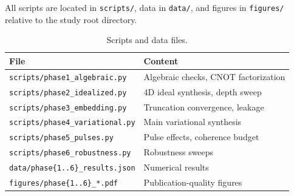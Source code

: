 \documentclass[11pt,a4paper]{article}
\begin{document}
All scripts are located in \texttt{scripts/}, data in \texttt{data/}, and
figures in \texttt{figures/} relative to the study root directory.

\begin{table}[H]
  \centering
  \caption{Scripts and data files.}
  \begin{tabular}{ll}
    \toprule
    File & Content \\
    \midrule
    \texttt{scripts/phase1\_algebraic.py} & Algebraic checks, CNOT factorization \\
    \texttt{scripts/phase2\_idealized.py} & 4D ideal synthesis, depth sweep \\
    \texttt{scripts/phase3\_embedding.py} & Truncation convergence, leakage \\
    \texttt{scripts/phase4\_variational.py} & Main variational synthesis \\
    \texttt{scripts/phase5\_pulses.py} & Pulse effects, coherence budget \\
    \texttt{scripts/phase6\_robustness.py} & Robustness sweeps \\
    \midrule
    \texttt{data/phase\{1..6\}\_results.json} & Numerical results \\
    \texttt{figures/phase\{1..6\}\_*.pdf} & Publication-quality figures \\
    \bottomrule
  \end{tabular}
\end{table}
\end{document}
